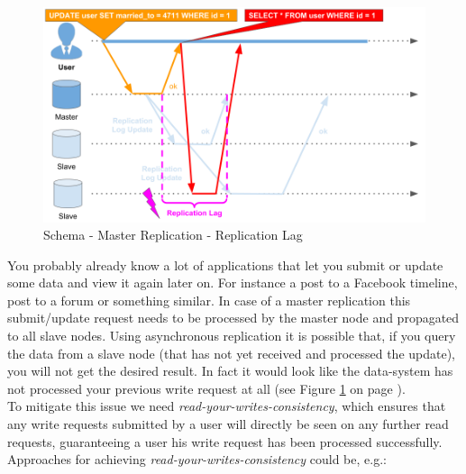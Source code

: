 {\begin{figure}[h]
	\centering
  \includegraphics[width=1\textwidth]{replication_schema_sl_replication_lag.png}
	\caption{Schema - Master Replication - Replication Lag}
	\label{schema_replication_sl_replication_lag}
\end{figure}

\newpage
{}
You probably already know a lot of applications that let you submit or update some data and view it again later on. For instance a post to a Facebook timeline, post to a forum or something similar. In case of a master replication this submit/update request needs to be processed by the master node and propagated to all slave nodes. Using asynchronous replication it is possible that, if you query the data from a slave node (that has not yet received and processed the update), you will not get the desired result. In fact it would look like the data-system has not processed your previous write request at all (see Figure \ref{schema_replication_sl_replication_lag} on page \pageref{schema_replication_sl_replication_lag}).\\
To mitigate this issue we need \textit{read-your-writes-consistency}, which ensures that any write requests submitted by a user will directly be seen on any further read requests, guaranteeing a user his write request has been processed successfully. Approaches for achieving \textit{read-your-writes-consistency} could be, e.g.:\\

}
